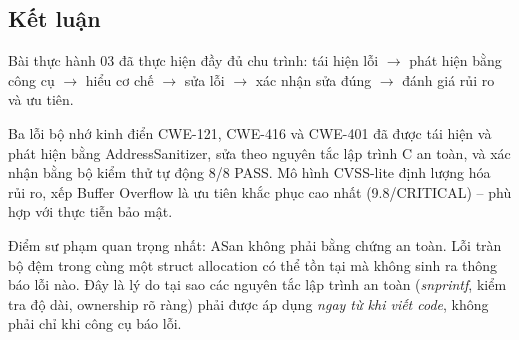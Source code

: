 \subsection{Kết luận}

Bài thực hành 03 đã thực hiện đầy đủ chu trình: tái hiện lỗi $\to$
phát hiện bằng công cụ $\to$ hiểu cơ chế $\to$ sửa lỗi $\to$
xác nhận sửa đúng $\to$ đánh giá rủi ro và ưu tiên.

Ba lỗi bộ nhớ kinh điển CWE-121, CWE-416 và CWE-401 đã được tái hiện và phát
hiện bằng AddressSanitizer, sửa theo nguyên tắc lập trình C an toàn, và xác
nhận bằng bộ kiểm thử tự động 8/8 PASS. Mô hình CVSS-lite định lượng hóa rủi
ro, xếp Buffer Overflow là ưu tiên khắc phục cao nhất (9.8/CRITICAL) -- phù
hợp với thực tiễn bảo mật.

Điểm sư phạm quan trọng nhất: ASan không phải bằng chứng an toàn. Lỗi tràn
bộ đệm trong cùng một struct allocation có thể tồn tại mà không sinh ra thông
báo lỗi nào. Đây là lý do tại sao các nguyên tắc lập trình an toàn
(\textit{snprintf}, kiểm tra độ dài, ownership rõ ràng) phải được áp dụng
\emph{ngay từ khi viết code}, không phải chỉ khi công cụ báo lỗi.
